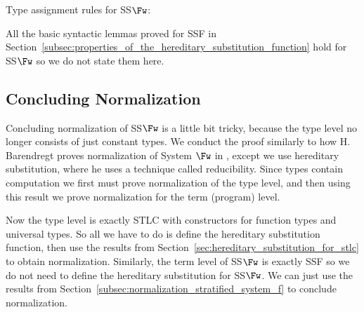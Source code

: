 \begin{definition}
  \label{fig:typing_rules_ssfw}
  Type assignment rules for SS$\Fw$:
  \begin{center}
    \end{center}
\end{definition}  
\noindent
All the basic syntactic lemmas proved for SSF in
Section~\ref{subsec:properties_of_the_hereditary_substitution_function}
hold for SS$\Fw$ so we do not state them here.

\subsection{Concluding Normalization}
\label{subsec:concluding_normalization_ssfw}
Concluding normalization of SS$\Fw$ is a little bit tricky, because
the type level no longer consists of just constant types.  We conduct
the proof similarly to how H. Barendregt proves normalization of
System $\Fw$ in \cite{barendregt92}, except we use hereditary
substitution, where he uses a technique called reducibility.  Since
types contain computation we first must prove normalization of the
type level, and then using this result we prove normalization for the
term (program) level.  

Now the type level is exactly STLC with constructors for function
types and universal types.  So all we have to do is define the
hereditary substitution function, then use the results from
Section~\ref{sec:hereditary_substitution_for_stlc} to
obtain normalization.  Similarly, the term level of SS$\Fw$ is exactly
SSF so we do not need to define the hereditary substitution for
SS$\Fw$.  We can just use the results from
Section~\ref{subsec:normalization_stratified_system_f} to conclude
normalization.  

